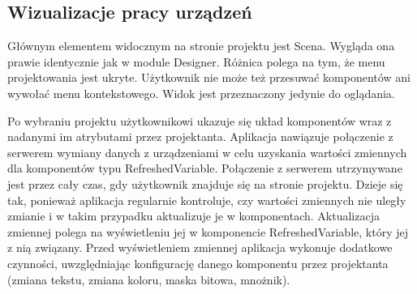 \subsection{Wizualizacje pracy urządzeń}
Głównym elementem widocznym na stronie projektu jest Scena. Wygląda ona prawie identycznie jak w module Designer. Różnica polega na tym, że menu projektowania jest ukryte. Użytkownik nie może też przesuwać komponentów ani wywołać menu kontekstowego. Widok jest przeznaczony jedynie do oglądania.
	
Po wybraniu projektu użytkownikowi ukazuje się układ komponentów wraz z nadanymi im atrybutami przez projektanta. Aplikacja nawiązuje połączenie z serwerem wymiany danych z urządzeniami w celu uzyskania wartości zmiennych dla komponentów typu RefreshedVariable. Połączenie z serwerem utrzymywane jest przez cały czas, gdy użytkownik znajduje się na stronie projektu. Dzieje się tak, ponieważ aplikacja regularnie kontroluje, czy wartości zmiennych nie uległy zmianie i w takim przypadku aktualizuje je w komponentach. Aktualizacja zmiennej polega na wyświetleniu jej w komponencie RefreshedVariable, który jej z nią związany. Przed wyświetleniem zmiennej aplikacja wykonuje dodatkowe czynności, uwzględniając konfigurację danego komponentu przez projektanta (zmiana tekstu, zmiana koloru, maska bitowa, mnożnik).